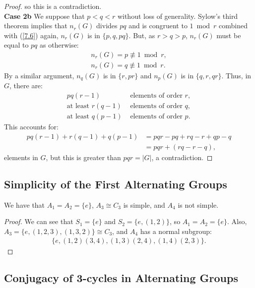 \begin{proof}
    so this is a contradiction.
    \\[\baselineskip]
    \textbf{Case 2b} We suppose that $p < q < r$ without loss of
    generality. Sylow's third theorem implies that
    $n_r(G)$ divides $pq$ and is congruent to $1 \bmod r$
    combined with (\ref{7.6}) again, $n_r(G)$ is in
    $\{p, q, pq\}$. But, as $r > q > p$, $n_r(G)$ must be
    equal to $pq$ as otherwise: \begin{align*}
        n_r(G) = p \not\equiv 1 \bmod r, \\ 
        n_r(G) = q \not\equiv 1 \bmod r.
    \end{align*} By a similar argument, $n_q(G)$ is in $\{r, pr\}$
    and $n_p(G)$ is in $\{q, r, qr\}$. Thus, in $G$,
    there are: \begin{align*}
        pq(r - 1) &\text{ elements of order } r, \\
        \text{at least } r(q - 1) &\text{ elements of order } q, \\
        \text{at least } q(p - 1) &\text{ elements of order } p.
    \end{align*} This accounts for: \begin{align*}
        pq(r - 1) + r(q - 1) + q(p - 1)
        &= pqr - pq + rq - r + qp - q \\
        &= pqr + (rq - r - q),
    \end{align*} elements in $G$, but this is greater than $pqr = |G|$,
    a contradiction.
\end{proof}

\subsection{Simplicity of the First Alternating Groups} \label{7.10}

We have that $A_1 = A_2 = \{e\}$, $A_3 \cong C_3$ is simple, and
$A_4$ is not simple.

\begin{proof}
    We can see that $S_1 = \{e\}$ and $S_2 = \{e, (1, 2)\}$,
    so $A_1 = A_2 = \{e\}$. Also, $A_3 = \{e, (1, 2, 3), (1, 3, 2)\}
    \cong C_3$, and $A_4$ has a normal subgroup: \begin{align*}
        \{e, (1, 2)(3, 4), (1, 3)(2, 4), (1, 4)(2, 3)\}.
    \end{align*}
\end{proof}

\subsection{Conjugacy of 3-cycles in Alternating Groups} \label{7.11}

